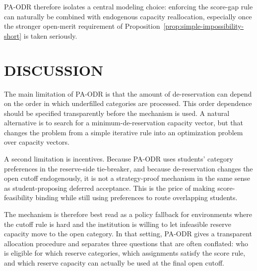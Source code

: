 \documentclass[a4paper,twoside]{article}
\begin{document}
PA-ODR therefore isolates a central modeling choice: enforcing the score-gap rule can naturally be combined with endogenous capacity reallocation, especially once the stronger open-merit requirement of Proposition~\ref{prop:simple-impossibility-short} is taken seriously.

\section{\uppercase{Discussion}}

The main limitation of PA-ODR is that the amount of de-reservation can depend on the order in which underfilled categories are processed. This order dependence should be specified transparently before the mechanism is used. A natural alternative is to search for a minimum-de-reservation capacity vector, but that changes the problem from a simple iterative rule into an optimization problem over capacity vectors.

A second limitation is incentives. Because PA-ODR uses students' category preferences in the reserve-side tie-breaker, and because de-reservation changes the open cutoff endogenously, it is not a strategy-proof mechanism in the same sense as student-proposing deferred acceptance. This is the price of making score-feasibility binding while still using preferences to route overlapping students.

The mechanism is therefore best read as a policy fallback for environments where the cutoff rule is hard and the institution is willing to let infeasible reserve capacity move to the open category. In that setting, PA-ODR gives a transparent allocation procedure and separates three questions that are often conflated: who is eligible for which reserve categories, which assignments satisfy the score rule, and which reserve capacity can actually be used at the final open cutoff.



\end{document}
